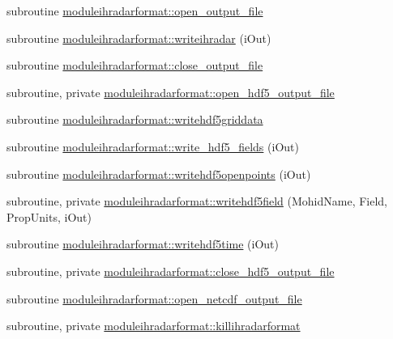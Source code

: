 \begin{DoxyCompactItemize}
\item 
subroutine \mbox{\hyperlink{namespacemoduleihradarformat_a1fa82a4000e864d7a0c4a4e1759efac9}{moduleihradarformat\+::open\+\_\+output\+\_\+file}}
\item 
subroutine \mbox{\hyperlink{namespacemoduleihradarformat_a6051373784b4b3c69f611fa904fbad43}{moduleihradarformat\+::writeihradar}} (i\+Out)
\item 
subroutine \mbox{\hyperlink{namespacemoduleihradarformat_a1107822e669c716ce7cbc68b6331ce30}{moduleihradarformat\+::close\+\_\+output\+\_\+file}}
\item 
subroutine, private \mbox{\hyperlink{namespacemoduleihradarformat_a923e50f44a04ab5c716a0a2526b165e1}{moduleihradarformat\+::open\+\_\+hdf5\+\_\+output\+\_\+file}}
\item 
subroutine \mbox{\hyperlink{namespacemoduleihradarformat_aded21feba733b9d42beced7d5846c854}{moduleihradarformat\+::writehdf5griddata}}
\item 
subroutine \mbox{\hyperlink{namespacemoduleihradarformat_ad98c4a786bbe9735cd7eb3b391ad9adb}{moduleihradarformat\+::write\+\_\+hdf5\+\_\+fields}} (i\+Out)
\item 
subroutine \mbox{\hyperlink{namespacemoduleihradarformat_a2599e1f0971dcb3531d9ee88d55830d8}{moduleihradarformat\+::writehdf5openpoints}} (i\+Out)
\item 
subroutine, private \mbox{\hyperlink{namespacemoduleihradarformat_a77312b34323d0e8aa7466fdfc0f8a35e}{moduleihradarformat\+::writehdf5field}} (Mohid\+Name, Field, Prop\+Units, i\+Out)
\item 
subroutine \mbox{\hyperlink{namespacemoduleihradarformat_abdd46dbddc8ccd64e7600d2abba43395}{moduleihradarformat\+::writehdf5time}} (i\+Out)
\item 
subroutine, private \mbox{\hyperlink{namespacemoduleihradarformat_ab845f946974ab4a693701022e7e4230e}{moduleihradarformat\+::close\+\_\+hdf5\+\_\+output\+\_\+file}}
\item 
subroutine \mbox{\hyperlink{namespacemoduleihradarformat_a26abbb9b22d84c708e9f26ef8003eff4}{moduleihradarformat\+::open\+\_\+netcdf\+\_\+output\+\_\+file}}
\item 
subroutine, private \mbox{\hyperlink{namespacemoduleihradarformat_af1f8f7e2cf6ebd67fd284bbb39a55018}{moduleihradarformat\+::killihradarformat}}
\end{DoxyCompactItemize}

